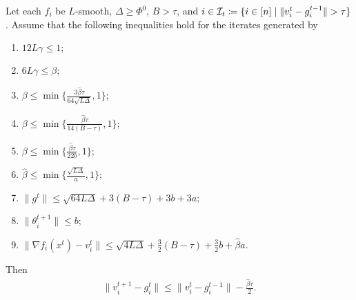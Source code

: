 \documentclass[a4paper,11pt]{article}
\begin{document}
\begin{lemma}\label{lem:bound_gt_vt_dp}
    Let each $f_i$ be $L$-smooth, $\Delta \ge \Phi^0$, $B > \tau$, and $i \in \mathcal{I}_t \coloneqq \{i\in[n]\mid \|v_i^t - g_i^{t-1}\| > \tau\}$. Assume that the following inequalities hold for the iterates generated by 
    \begin{enumerate}
        \item $12L\gamma \le 1;$
        \item $6L\gamma \le \beta;$
        \item $\beta \le \min\{\frac{3\hat{\beta}\tau}{64\sqrt{L\Delta}},1\}$;
        \item $\beta \le \min\{\frac{\hat{\beta}\tau}{14(B-\tau)},1\};$
        \item $\beta \le \min\{\frac{\hat{\beta}\tau}{22b},1\}$;
        \item $\hat{\beta} \le \min\{\frac{\sqrt{L\Delta}}{a},1\};$
        \item $\|g^t\| \le \sqrt{64L\Delta} + 3(B-\tau) + 3b + 3a;$
        \item $\|\theta^{t+1}_i\| \le b;$
        \item $\|\nabla f_i(x^t) - v_i^t\| \le \sqrt{4L\Delta} + \frac{3}{2}(B-\tau) + \frac{3}{2}b +
        \hat{\beta}a.$
    \end{enumerate}
    Then 
    \begin{align}
        \|v_i^{t+1} - g_i^t\| \le \|v_i^t-g_i^{t-1}\| - \frac{\hat{\beta}\tau}{2}.
    \end{align}
\end{lemma}
\end{document}
